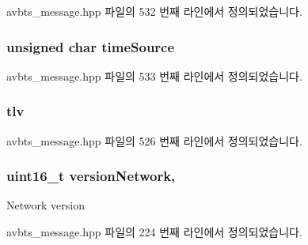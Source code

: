 avbts\+\_\+message.\+hpp 파일의 532 번째 라인에서 정의되었습니다.

\subsubsection[{\texorpdfstring{time\+Source}{timeSource}}]{\setlength{\rightskip}{0pt plus 5cm}unsigned char time\+Source\hspace{0.3cm}{\ttfamily [private]}}\hypertarget{class_p_t_p_message_announce_a56fd97f48cb931b2450032650f82ef17}{}\label{class_p_t_p_message_announce_a56fd97f48cb931b2450032650f82ef17}


avbts\+\_\+message.\+hpp 파일의 533 번째 라인에서 정의되었습니다.

\subsubsection[{\texorpdfstring{tlv}{tlv}}]{ tlv\hspace{0.3cm}{\ttfamily [private]}}\hypertarget{class_p_t_p_message_announce_ac7b185260086ad357ff7a9c29f468936}{}\label{class_p_t_p_message_announce_ac7b185260086ad357ff7a9c29f468936}


avbts\+\_\+message.\+hpp 파일의 526 번째 라인에서 정의되었습니다.

\subsubsection[{\texorpdfstring{version\+Network}{versionNetwork}}]{\setlength{\rightskip}{0pt plus 5cm}uint16\+\_\+t version\+Network\hspace{0.3cm}{\ttfamily [protected]}, {\ttfamily [inherited]}}\hypertarget{class_p_t_p_message_common_a79d99d7b79ee6ad4bbd03b301ccccb53}{}\label{class_p_t_p_message_common_a79d99d7b79ee6ad4bbd03b301ccccb53}
Network version 

avbts\+\_\+message.\+hpp 파일의 224 번째 라인에서 정의되었습니다.

